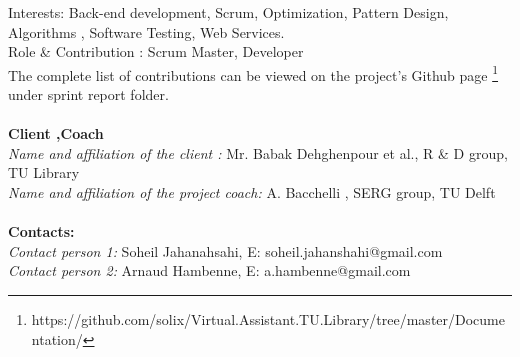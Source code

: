    Interests: Back-end development, Scrum, Optimization, Pattern Design, Algorithms , Software Testing, Web Services.\\ 
   Role \& Contribution : Scrum Master, Developer\\
The complete list of contributions can be viewed on the project's Github page \footnote{https://github.com/solix/Virtual.Assistant.TU.Library/tree/master/Documentation/} under sprint report folder.\\\\
\textbf{Client ,Coach \\}
\textit{Name and affiliation of the client : } Mr. Babak Dehghenpour et al., R \& D group, TU Library\\
\textit{Name and affiliation of the project coach:} A. Bacchelli , SERG group, TU Delft \\\\
\textbf{Contacts: \\}
\textit{Contact person 1: } Soheil Jahanahsahi, E: soheil.jahanshahi@gmail.com \\
\textit{Contact person 2: } Arnaud Hambenne, E: a.hambenne@gmail.com 


